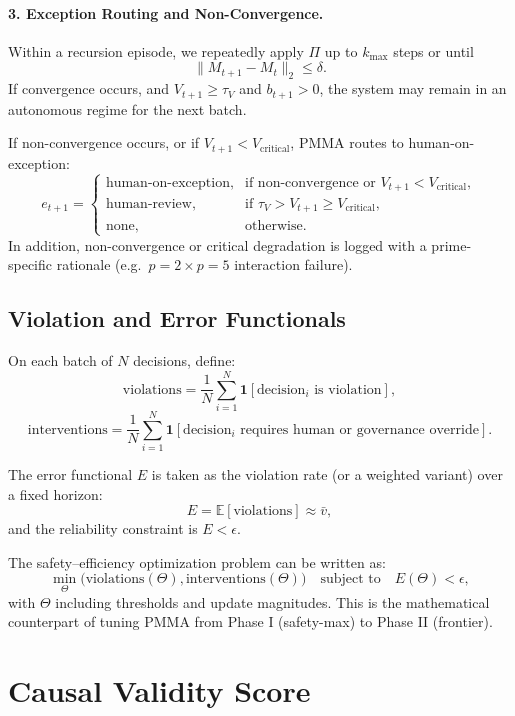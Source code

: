\documentclass[11pt]{article}
\begin{document}
\paragraph{3. Exception Routing and Non-Convergence.}

Within a recursion episode, we repeatedly apply $\Pi$ up to $k_\mathrm{max}$ steps or until
\[
  \|M_{t+1} - M_t\|_2 \le \delta.
\]
If convergence occurs, and $V_{t+1} \ge \tau_V$ and $b_{t+1} > 0$, the system may remain in an autonomous regime for the next batch.

If non-convergence occurs, or if $V_{t+1} < V_\mathrm{critical}$, PMMA routes to human-on-exception:
\[
  e_{t+1} = \begin{cases}
    \text{human-on-exception}, & \text{if non-convergence or } V_{t+1} < V_\mathrm{critical}, \\
    \text{human-review}, & \text{if } \tau_V > V_{t+1} \ge V_\mathrm{critical}, \\
    \text{none}, & \text{otherwise}.
  \end{cases}
\]
In addition, non-convergence or critical degradation is logged with a prime-specific rationale (e.g.\ $p=2 \times p=5$ interaction failure).

\subsection{Violation and Error Functionals}

On each batch of $N$ decisions, define:
\[
  \text{violations} = \frac{1}{N} \sum_{i=1}^N \mathbf{1}[\text{decision}_i \text{ is violation}],
\]
\[
  \text{interventions} = \frac{1}{N} \sum_{i=1}^N \mathbf{1}[\text{decision}_i \text{ requires human or governance override}].
\]

The error functional $E$ is taken as the violation rate (or a weighted variant) over a fixed horizon:
\[
  E = \mathbb{E}[\text{violations}] \approx \bar{v},
\]
and the reliability constraint is $E < \epsilon$.

The safety--efficiency optimization problem can be written as:
\[
  \min_{\Theta} \bigl(\text{violations}(\Theta), \text{interventions}(\Theta)\bigr)
  \quad \text{subject to} \quad E(\Theta) < \epsilon,
\]
with $\Theta$ including thresholds and update magnitudes.
This is the mathematical counterpart of tuning PMMA from Phase I (safety-max) to Phase II (frontier).

\section{Causal Validity Score}
\end{document}
